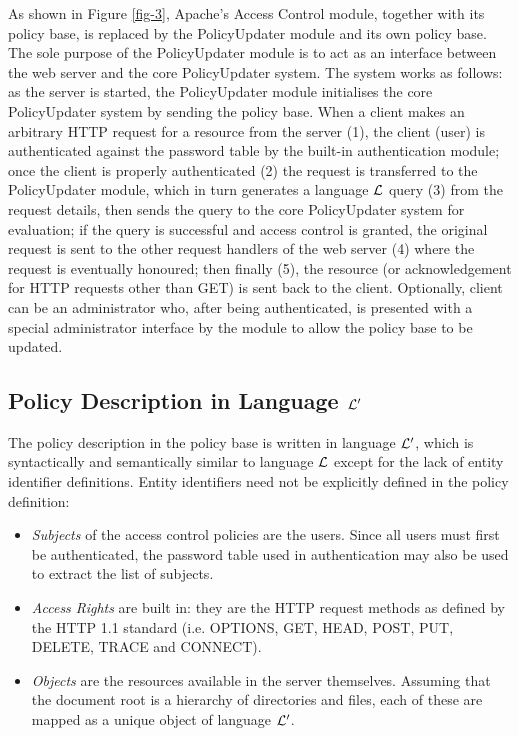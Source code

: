 \documentclass[global,twocolumn,final]{svjour}
\begin{document}
    As shown in Figure \ref{fig-3}, Apache's Access Control module, together
    with its policy base, is replaced by the PolicyUpdater module and its own
    policy base. The sole purpose of the PolicyUpdater module is to act as an
    interface between the web server and the core PolicyUpdater system. The
    system works as follows: as the server is started, the PolicyUpdater
    module initialises the core PolicyUpdater system by sending the policy
    base. When a client makes an arbitrary HTTP request for a resource from
    the server (1), the client (user) is authenticated against the password
    table by the built-in authentication module; once the client is properly
    authenticated (2) the request is transferred to the PolicyUpdater module,
    which in turn generates a language ${\cal L}$ query (3) from the request
    details, then sends the query to the core PolicyUpdater system for
    evaluation; if the query is successful and access control is granted,
    the original request is sent to the other request handlers of the web
    server (4) where the request is eventually honoured; then finally (5),
    the resource (or acknowledgement for HTTP requests other than GET) is sent
    back to the client. Optionally, client can be an administrator who,
    after being authenticated, is presented with a special administrator
    interface by the module to allow the policy base to be updated.

    \subsection{Policy Description in Language ${\cal L'}$}

      The policy description in the policy base is written in language
      ${\cal L'}$, which is syntactically and semantically similar to
      language ${\cal L}$ except for the lack of entity identifier
      definitions. Entity identifiers need not be explicitly defined in
      the policy definition:

      \begin{itemize}
        \item
          {\em Subjects} of the access control policies are the users. Since
          all users must first be authenticated, the password table used
          in authentication may also be used to extract the list of subjects.
        \item
          {\em Access Rights} are built in: they are the HTTP request methods
          as defined by the HTTP 1.1 standard \cite{HTTP1} (i.e. OPTIONS, GET,
          HEAD, POST, PUT, DELETE, TRACE and CONNECT).
        \item
          {\em Objects} are the resources available in the server themselves.
          Assuming that the document root is a hierarchy of directories and
          files, each of these are mapped as a unique object of language
          ${\cal L'}$.
      \end{itemize}
\end{document}
